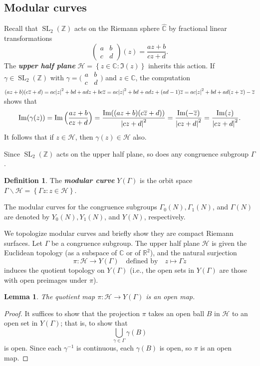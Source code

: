 \documentclass[10pt,leqno]{article}
\theoremstyle{plain}
\newtheorem{lemma}[lem]{Lemma}
\theoremstyle{definition}
\newtheorem{definition}[lem]{Definition}
\numberwithin{equation}{section}
\numberwithin{lem}{section}
\newcommand{\cbr}[1]{\left\{#1\right\}}
\newcommand{\textib}[1]{\textbf{\textit{#1}}}
\DeclareMathOperator{\SL}{SL}
\newcommand{\smallabcd}{\big(\!\begin{smallmatrix}
    a & b \\ c & d
\end{smallmatrix}\!\big)}
\newcommand{\abcd}{\begin{pmatrix}
    a & b \\ c & d
\end{pmatrix}}
\newcommand{\slz}{\SL_2(\mathbb{Z})}
\begin{document}
\subsection{Modular curves}
Recall that $\slz$ acts on the Riemann sphere $\widehat{\mathbb{C}}$ by fractional linear transformations \[\abcd(z) = \frac{az + b}{cz+d}.\] The \textib{upper half plane} $\mathcal{H} = \cbr{z\in\mathbb{C} : \Im(z)}$ inherits this action. If $\gamma\in \slz$ with $\gamma = \smallabcd$ and $z\in \mathbb C$, the computation $(az+b)(c\overline z + d) = ac\abs{z}^2+bd + adz + bc\overline z = ac\abs{z}^2+bd + adz + (ad-1)\overline z = ac\abs{z}^2+bd + ad(z+\overline z) -\overline z$ shows that
\begin{equation}\label{eq: imaginary parts}
    \Im(\gamma(z)) = \Im\Big(\frac{az+b}{cz+d}\Big) = \frac{\Im((az+b)(c\overline z + d))}{\abs{cz+d}^2} = \frac{\Im(-\overline z)}{\abs{cz+d}^2} = \frac{\Im(z)}{\abs{cz+d}^2}.
\end{equation}
It follows that if $z\in \mathcal{H}$, then $\gamma(z)\in \mathcal{H}$ also.

Since $\slz$ acts on the upper half plane, so does any congruence subgroup $\varGamma$. 
\begin{definition}
    The \textib{modular curve} $Y(\varGamma)$ is the orbit space $\varGamma\backslash \mathcal{H} = \cbr{\varGamma z : z\in\mathcal H}$.
\end{definition}
The modular curves for the congruence subgroups $\varGamma_0(N), \varGamma_1(N)$, and $\varGamma(N)$ are denoted by $Y_0(N), Y_1(N)$, and $Y(N)$, respectively.

We topologize modular curves and briefly show they are compact Riemann surfaces. Let $\varGamma$ be a congruence subgroup. The upper half plane $\mathcal H$ is given the Euclidean topology (as a subspace of $\mathbb{C}$ or of $\mathbb{R}^2$), and the natural surjection \[\pi \colon \mathcal H \to Y(\varGamma)\quad \text{defined by}\quad  z\mapsto \varGamma z\] induces the quotient topology on $Y(\varGamma)$ (i.e., the open sets in $Y(\varGamma)$ are those with open preimages under $\pi$).

\begin{lemma}\label{lem: slz acts as open maps}
    The quotient map $\pi \colon \mathcal H \to Y(\varGamma)$ is an open map.
\end{lemma}
\begin{proof}
    It suffices to show that the projection $\pi$ takes an open ball $B$ in $\mathcal{H}$ to an open set in $Y(\varGamma)$; that is, to show that \[\bigcup_{\gamma\in \varGamma}\gamma(B)\] is open. Since each $\gamma^{-1}$ is continuous, each $\gamma(B)$ is open, so $\pi$ is an open map.
\end{proof}
\end{document}
